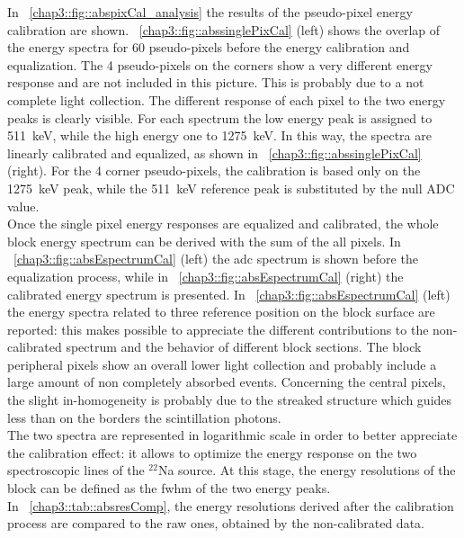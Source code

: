 In \figurename~\ref{chap3::fig::abspixCal_analysis} the results of the pseudo-pixel energy calibration are shown. \figurename~\ref{chap3::fig::abssinglePixCal} (left) shows the overlap of the energy spectra for 60 pseudo-pixels before the energy calibration and equalization. The 4 pseudo-pixels on the corners show a very different energy response and are not included in this picture. This is probably due to a not complete light collection. The different response of each pixel to the two energy peaks is clearly visible. For each spectrum the low energy peak is assigned to 511~keV, while the high energy one to 1275~keV. In this way, the spectra are linearly calibrated and equalized, as shown in \figurename~\ref{chap3::fig::abssinglePixCal} (right). For the 4 corner pseudo-pixels, the calibration is based only on the 1275~keV peak, while the 511~keV reference peak is substituted by the null ADC value.\\
Once the single pixel energy responses are equalized and calibrated, the whole block energy spectrum can be derived with the sum of the all pixels. In \figurename~\ref{chap3::fig::absEspectrumCal} (left) the \gls{adc} spectrum is shown before the equalization process, while in \figurename~\ref{chap3::fig::absEspectrumCal} (right) the calibrated energy spectrum is presented. In \figurename~\ref{chap3::fig::absEspectrumCal} (left) the energy spectra related to three reference position on the block surface are reported: this makes possible to appreciate  the different contributions to the non-calibrated spectrum and the behavior of different block sections. The block peripheral pixels show an overall lower light collection and probably include a large amount of non completely absorbed events. Concerning the central pixels, the slight in-homogeneity is probably due to the streaked structure which guides less than on the borders the scintillation photons.\\
The two spectra are represented in logarithmic scale in order to better appreciate the calibration effect: it allows to optimize the energy response on the two spectroscopic lines of the $^{22}$Na source. At this stage, the energy resolutions of the block can be defined as the \gls{fwhm} of the two energy peaks.\\
In \tablename~\ref{chap3::tab::absresComp}, the energy resolutions derived after the calibration process are compared to the raw ones, obtained by the non-calibrated data.


